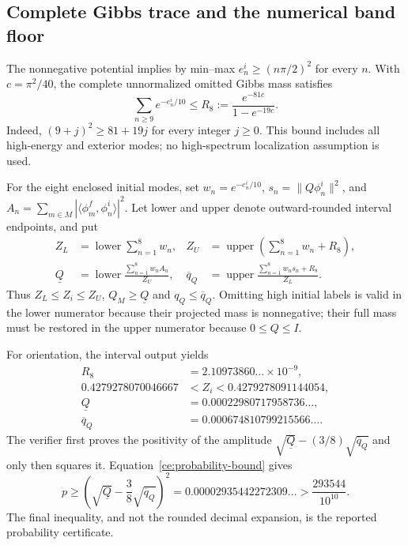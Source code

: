 \documentclass[aps,prl,reprint,superscriptaddress,longbibliography]{revtex4-2}
\begin{document}
\subsection{Complete Gibbs trace and the numerical band floor}

The nonnegative potential implies by min--max
$e_n^i\ge(n\pi/2)^2$ for every $n$. With $c=\pi^2/40$, the complete
unnormalized omitted Gibbs mass satisfies
\begin{equation}
 \sum_{n\ge9}e^{-e_n^i/10}
 \le R_8:=\frac{e^{-81c}}{1-e^{-19c}}.
 \label{ce:thermal-tail}
\end{equation}
Indeed, $(9+j)^2\ge81+19j$ for every integer $j\ge0$. This bound includes
all high-energy and exterior modes; no high-spectrum localization
assumption is used.

For the eight enclosed initial modes, set
$w_n=e^{-e_n^i/10}$, $s_n=\|Q\phi_n^i\|^2$, and
$A_n=\sum_{m\in M}|\langle\phi_m^f,\phi_n^i\rangle|^2$.
Let lower and upper denote outward-rounded interval endpoints, and put
\begin{align}
 Z_L&=\operatorname{lower}\sum_{n=1}^{8}w_n,&
 Z_U&=\operatorname{upper}\left(\sum_{n=1}^{8}w_n+R_8\right),\nonumber\\
 \underline Q&=\operatorname{lower}
       \frac{\sum_{n=1}^{8}w_nA_n}{Z_U},&
 \overline q_Q&=\operatorname{upper}
       \frac{\sum_{n=1}^{8}w_ns_n+R_8}{Z_L}.
 \label{ce:thermal-enclosures}
\end{align}
Thus $Z_L\le Z_i\le Z_U$, $Q_M\ge\underline Q$ and
$q_Q\le\overline q_Q$. Omitting high initial labels is valid in the lower
numerator because their projected mass is nonnegative; their full mass
must be restored in the upper numerator because $0\le Q\le I$.

For orientation, the interval output yields
\begin{align}
 R_8&=2.10973860\ldots\times10^{-9},\nonumber\\
 0.4279278070046667&<Z_i<0.4279278091144054,\nonumber\\
 \underline Q&=0.00022980717958736\ldots,\nonumber\\
 \overline q_Q&=0.000674810799215566\ldots.
 \label{ce:static-values}
\end{align}
The verifier first proves the positivity of the amplitude
$\sqrt{\underline Q}-(3/8)\sqrt{\overline q_Q}$ and only then squares it.
Equation~\eqref{ce:probability-bound} gives
\begin{equation}
 p\ge
 \left(\sqrt{\underline Q}-\frac38\sqrt{\overline q_Q}\right)^2
 =0.00002935442272309\ldots
 >\frac{293544}{10^{10}}.
 \label{ce:finite-band-floor}
\end{equation}
The final inequality, and not the rounded decimal expansion, is the
reported probability certificate.
\end{document}
